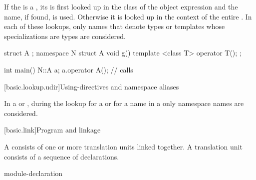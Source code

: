 \pnum
If the  is a ,
its 
is first looked up
in the class of the object expression
and the name, if
found, is used. Otherwise it is looked up in the context
of the entire .
In each of these lookups, only names that denote types or templates whose
specializations are types are considered.
\begin{example}
\begin{codeblock}
struct A { };
namespace N {
  struct A {
    void g() { }
    template <class T> operator T();
  };
}

int main() {
  N::A a;
  a.operator A();               // calls 
}
\end{codeblock}
\end{example}

[basic.lookup.udir]{Using-directives and namespace aliases}

\pnum
{}%
%
In a  or ,
during the lookup for a  or for a name in a
only namespace names are considered.%
%

[basic.link]{Program and linkage}%

\pnum
{}%
A  consists of one or more translation units
linked together. A translation unit consists
of a sequence of declarations.

\begin{bnf}
\br
    \br
     module-declaration  
\end{bnf}

